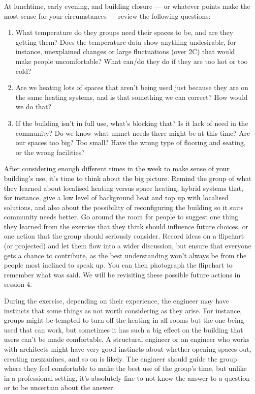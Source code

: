 \documentclass[letterpaper,10pt,english]{jupyterBook}
\begin{document}
\sphinxAtStartPar
At lunchtime, early evening, and building closure  — or whatever points make the most sense for your circumstances — review the following questions:
\begin{enumerate}
%
\item {} 
\sphinxAtStartPar
What temperature do they groups need their spaces to be, and are they getting them?  Does the temperature data show anything undesirable, for instance, unexplained changes or large fluctuations (over 2C) that would make people uncomfortable? What can/do they do if they are too hot or too cold?

\item {} 
\sphinxAtStartPar
Are we heating lots of spaces that aren’t being used just because they are on the same heating systems, and is that something we can correct?  How would we do that?

\item {} 
\sphinxAtStartPar
If the building isn’t in full use, what’s blocking that?  Is it lack of need in the community?  Do we know what unmet needs there might be at this time?  Are our spaces too big?  Too small? Have the wrong type of flooring and seating, or the wrong facilities?

\end{enumerate}

\sphinxAtStartPar
After considering enough different times in the week to make sense of your building’s use, it’s time to think about the big picture.  Remind the group of what they learned about localised heating versus space heating, hybrid systems that, for instance, give a low level of background heat and top up with localised solutions, and also about the possibility of reconfiguring the building so it suits community needs better.  Go around the room for people to suggest one thing they learned from the exercise that they think should influence future choices, or one action that the group should seriously consider.  Record ideas on a flipchart (or projected) and let them flow into a wider discussion, but ensure that everyone gets a chance to contribute, as the best understanding won’t always be from the people most inclined to speak up.  You can then photograph the flipchart to remember what was said.  We will be revisiting these possible future actions in session 4.

\sphinxAtStartPar
During the exercise, depending on their experience, the engineer may have instincts that some things as not worth considering as they arise.  For instance, groups might be tempted to turn off the heating in all rooms but the one being used \sphinxhyphen{} that can work, but sometimes it has such a big effect on the building that users can’t be made comfortable.  A structural engineer or an engineer who works with architects might have very good instincts about whether opening spaces out, creating mezzanines, and so on is likely.  The engineer should guide the group where they feel comfortable to make the best use of the group’s time, but unlike in a professional setting, it’s absolutely fine to not know the answer to a question or to be uncertain about the answer.
\end{document}
